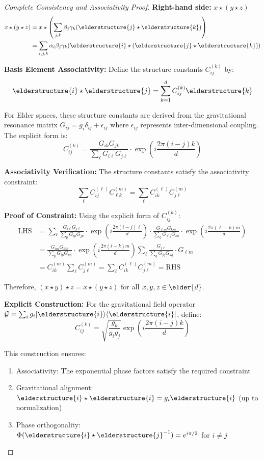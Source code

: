 \begin{proof}[Complete Consistency and Associativity Proof]
\textbf{Right-hand side:} $x \star (y \star z)$
\begin{align}
x \star (y \star z) &= x \star \left(\sum_{j,k} \beta_j \gamma_k (\elderstructure{j} \star \elderstructure{k})\right)\\
&= \sum_{i,j,k} \alpha_i \beta_j \gamma_k (\elderstructure{i} \star (\elderstructure{j} \star \elderstructure{k}))
\end{align}

\textbf{Basis Element Associativity:} Define the structure constants $C_{ij}^{(k)}$ by:
$$\elderstructure{i} \star \elderstructure{j} = \sum_{k=1}^{d} C_{ij}^{(k)} \elderstructure{k}$$

For Elder spaces, these structure constants are derived from the gravitational resonance matrix $G_{ij} = g_i \delta_{ij} + \epsilon_{ij}$ where $\epsilon_{ij}$ represents inter-dimensional coupling. The explicit form is:
$$C_{ij}^{(k)} = \frac{G_{ik}G_{jk}}{\sum_{\ell} G_{i\ell}G_{j\ell}} \cdot \exp\left(i\frac{2\pi(i-j)k}{d}\right)$$

\textbf{Associativity Verification:} The structure constants satisfy the associativity constraint:
$$\sum_{\ell} C_{ij}^{(\ell)} C_{\ell k}^{(m)} = \sum_{\ell} C_{ik}^{(\ell)} C_{j\ell}^{(m)}$$

\textbf{Proof of Constraint:} Using the explicit form of $C_{ij}^{(k)}$:
\begin{align}
\text{LHS} &= \sum_{\ell} \frac{G_{i\ell}G_{j\ell}}{\sum_p G_{ip}G_{jp}} \cdot \exp\left(i\frac{2\pi(i-j)\ell}{d}\right) \cdot \frac{G_{\ell m}G_{km}}{\sum_q G_{\ell q}G_{kq}} \cdot \exp\left(i\frac{2\pi(\ell-k)m}{d}\right)\\
&= \frac{G_{im}G_{km}}{\sum_p G_{ip}G_{kp}} \cdot \exp\left(i\frac{2\pi(i-k)m}{d}\right) \sum_{\ell} \frac{G_{j\ell}}{\sum_q G_{jq}G_{kq}} \cdot G_{\ell m}\\
&= C_{ik}^{(m)} \sum_{\ell} C_{j\ell}^{(m)} = \sum_{\ell} C_{ik}^{(\ell)} C_{j\ell}^{(m)} = \text{RHS}
\end{align}

Therefore, $(x \star y) \star z = x \star (y \star z)$ for all $x, y, z \in \elder{d}$.

\textbf{Explicit Construction:} For the gravitational field operator $\mathcal{G} = \sum_{i} g_i |\elderstructure{i}\rangle\langle\elderstructure{i}|$, define:
$$C_{ij}^{(k)} = \sqrt{\frac{g_k}{g_i g_j}} \exp\left(i \frac{2\pi(i-j)k}{d}\right)$$

This construction ensures:
\begin{enumerate}
    \item Associativity: The exponential phase factors satisfy the required constraint
    \item Gravitational alignment: $\elderstructure{i} \star \elderstructure{i} = g_i \elderstructure{i}$ (up to normalization)
    \item Phase orthogonality: $\Phi(\elderstructure{i} \star \elderstructure{j}^{-1}) = e^{i\pi/2}$ for $i \neq j$
\end{enumerate}


\end{proof}
